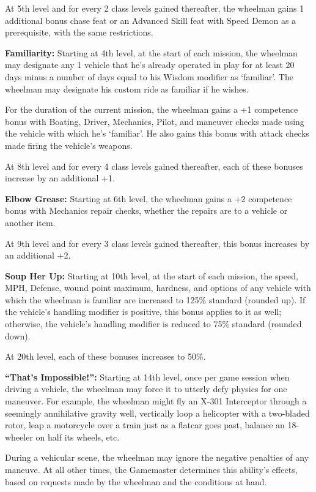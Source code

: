 At 5th level and for every 2 class levels gained thereafter, the wheelman gains 1 additional bonus chase feat or an Advanced Skill feat with Speed Demon as a prerequisite, with the same restrictions.

\textbf{Familiarity:} Starting at 4th level, at the start of each mission, the wheelman may designate any 1 vehicle that he’s already operated in play for at least 20 days minus a number of days equal to his Wisdom modifier as ‘familiar’. The wheelman may designate his custom ride as familiar if he wishes.

For the duration of the current mission, the wheelman gains a +1 competence bonus with Boating, Driver, Mechanics, Pilot, and maneuver checks made using the vehicle with which he’s ‘familiar’. He also gains this bonus with attack checks made firing the vehicle’s weapons.

At 8th level and for every 4 class levels gained thereafter, each of these bonuses increase by an additional +1.

\textbf{Elbow Grease:} Starting at 6th level, the wheelman gains a +2 competence bonus with Mechanics repair checks, whether the repairs are to a vehicle or another item.

At 9th level and for every 3 class levels gained thereafter, this bonus increases by an additional +2.

\textbf{Soup Her Up:} Starting at 10th level, at the start of each mission, the speed, MPH, Defense, wound point maximum, hardness, and options of any vehicle with which the wheelman is familiar are increased to 125\% standard (rounded up). If the vehicle’s handling modifier is positive, this bonus applies to it as well; otherwise, the vehicle’s handling modifier is reduced to 75\% standard (rounded down).

At 20th level, each of these bonuses increases to 50\%.

\textbf{“That’s Impossible!”:} Starting at 14th level, once per game session when driving a vehicle, the wheelman may force it to utterly defy physics for one maneuver. For example, the wheelman might fly an X-301 Interceptor through a seemingly annihilative gravity well, vertically loop a helicopter with a two-bladed rotor, leap a motorcycle over a train just as a flatcar goes past, balance an 18-wheeler on half its wheels, etc.

During a vehicular scene, the wheelman may ignore the negative penalties of any maneuve. At all other times, the Gamemaster determines this ability’s effects, based on requests made by the wheelman and the conditions at hand.



